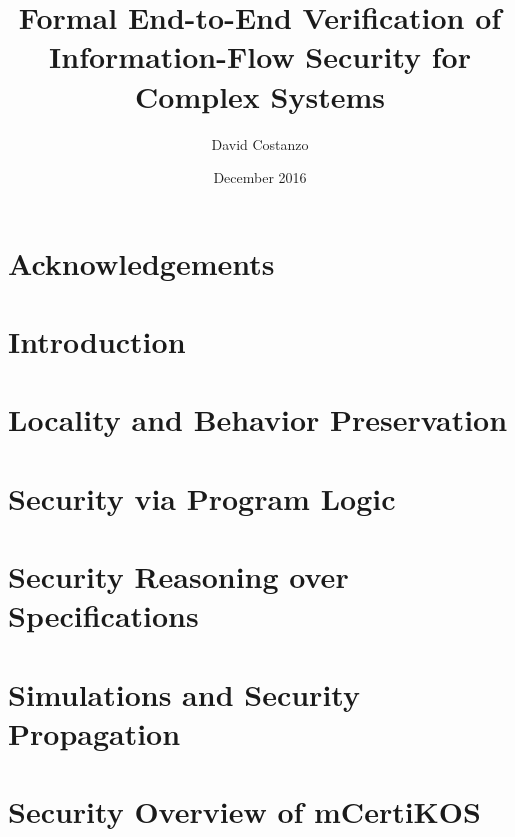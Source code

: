 \documentclass[letterpaper,12pt,nonatbib]{yalephd}
\begin{document}
\title{Formal End-to-End Verification of Information-Flow Security for Complex Systems}
\author{David Costanzo}
\date{December 2016}

\frontmatter




\maketitle
{}
\tableofcontents
\listoffigures

\chapter{Acknowledgements}


\mainmatter




\chapter{Introduction}


\chapter{Locality and Behavior Preservation}





\chapter{Security via Program Logic}




\chapter{Security Reasoning over Specifications}



\chapter{Simulations and Security Propagation}


\chapter{Security Overview of mCertiKOS}

\end{document}
